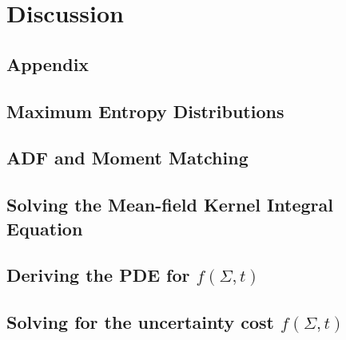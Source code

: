 \documentclass[justified,a4paper]{tufte-book}
\begin{document}
\label{chap:optimal}



\chapter{Discussion}



{}


\begin{appendices}

\chapter{Appendix}
\section{Maximum Entropy Distributions}
\label{app:entropy}

\section{ADF and Moment Matching}
\label{app:moment}

\section{Solving the Mean-field Kernel Integral Equation}
\label{app:kernel_integral}

\section{Deriving the PDE for $f(\Sigma,t)$}
\label{app:f_sigma}

\section{Solving for the uncertainty cost $f(\Sigma,t)$}
\label{app:feynman_kac}

\end{appendices}
\end{document}
